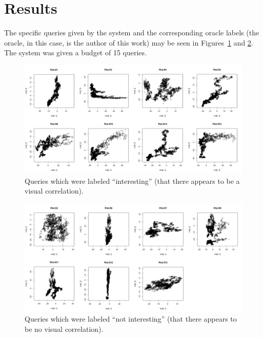 \section{Results}
\label{sec:usage:results}

The specific queries given by the system and the corresponding oracle labels 
(the oracle, in this case, is the author of this work) may be seen in 
Figures~\ref{fig:usage:interesting} and \ref{fig:usage:notinteresting}. The 
system was given a budget of 15 queries.

\begin{figure}[htb]
	\begin{center}
		\includegraphics[width=1\linewidth]{ch-usage/figures/y_all}
		\caption[Queries which were labeled ``interesting''.]{Queries 
		which were labeled ``interesting'' (that there appears to be a visual 
		correlation).}
		\label{fig:usage:interesting}
	\end{center}
\end{figure}

\begin{figure}[H]
	\begin{center}
		\includegraphics[width=1\linewidth]{ch-usage/figures/n_all}
		\caption[Queries which were labeled ``not interesting''.]{Queries 
			which were labeled ``not interesting'' (that there appears to be no 
			visual correlation).}
		\label{fig:usage:notinteresting}
	\end{center}
\end{figure}

